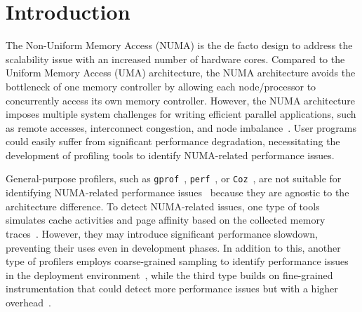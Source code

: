 \section{Introduction}
\label{sec:intro}

The Non-Uniform Memory Access (NUMA) is the de facto design to address the scalability issue with an increased number of hardware cores. Compared to the Uniform Memory Access (UMA) architecture, the NUMA architecture avoids the bottleneck of one memory controller by allowing each node/processor to concurrently access its own memory controller. However, the NUMA architecture imposes multiple system challenges for writing efficient parallel applications, such as remote accesses, interconnect congestion, and node imbalance~\cite{Blagodurov:2011:CNC:2002181.2002182}. User programs could easily suffer from significant performance degradation, necessitating the development of profiling tools to identify NUMA-related performance issues. 

General-purpose profilers, such as \texttt{gprof}~\cite{DBLP:conf/sigplan/GrahamKM82}, \texttt{perf}~\cite{perf}, or \texttt{Coz}~\cite{Coz}, are not suitable for identifying NUMA-related performance issues~\cite{XuNuma,valat:2018:numaprof} because they are agnostic to the architecture difference. 
To detect NUMA-related issues, one type of tools
simulates cache activities and page affinity based on the collected memory traces~\cite{NUMAGrind, MACPO}. However, they may introduce significant performance slowdown, preventing their uses even in development phases. In addition to this, another type of profilers employs coarse-grained sampling to identify performance issues in the deployment environment~\cite{Intel:VTune, Memphis, Lachaize:2012:MMP:2342821.2342826, XuNuma, NumaMMA, 7847070}, while the third type builds on fine-grained instrumentation that could detect more performance issues but with a higher overhead~\cite{diener2015characterizing, valat:2018:numaprof}. 


